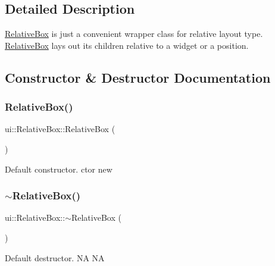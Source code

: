 \subsection{Detailed Description}
\hyperlink{classui_1_1RelativeBox}{Relative\+Box} is just a convenient wrapper class for relative layout type. \hyperlink{classui_1_1RelativeBox}{Relative\+Box} lays out its children relative to a widget or a position. 

\subsection{Constructor \& Destructor Documentation}
\mbox{\label{classui_1_1RelativeBox_a8568d3154c93a3b6ca1ffcfc5d68cf89}} 
\subsubsection{\texorpdfstring{Relative\+Box()}{RelativeBox()}\hspace{0.1cm}{\footnotesize\ttfamily [1/2]}}
{\footnotesize\ttfamily ui\+::\+Relative\+Box\+::\+Relative\+Box (\begin{DoxyParamCaption}{ }\end{DoxyParamCaption})}

Default constructor.  ctor  new \mbox{\label{classui_1_1RelativeBox_aafab5ee7d5cd33300e7a531ec27e7c13}} 
\subsubsection{\texorpdfstring{$\sim$\+Relative\+Box()}{~RelativeBox()}\hspace{0.1cm}{\footnotesize\ttfamily [1/2]}}
{\footnotesize\ttfamily ui\+::\+Relative\+Box\+::$\sim$\+Relative\+Box (\begin{DoxyParamCaption}{ }\end{DoxyParamCaption})\hspace{0.3cm}{\ttfamily [virtual]}}

Default destructor.  NA  NA \mbox{\label{classui_1_1RelativeBox_a8568d3154c93a3b6ca1ffcfc5d68cf89}} 
